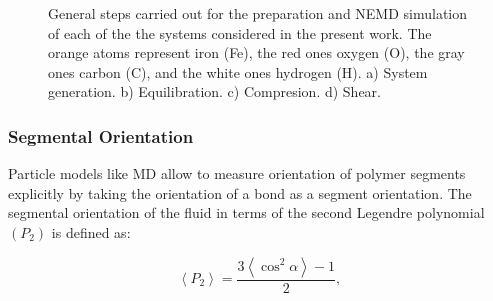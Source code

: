 \documentclass[aps,prb,reprint,superscriptaddress, a4paper]{revtex4-1}
\begin{document}
\begin{figure}
\begin{center}

		\caption{General steps carried out for the preparation and NEMD simulation of   each of the the systems considered in the present work. The orange atoms represent iron (Fe), the red ones oxygen (O), the gray ones carbon (C), and the white ones hydrogen (H). a) System generation. b) Equilibration. c) Compresion. d) Shear. }
		\label{fig:Steps}
	\end{center}
\end{figure}


\subsubsection{Segmental Orientation}

Particle models like MD allow to measure orientation of polymer segments explicitly by taking the orientation of a bond as a segment orientation. The segmental orientation \cite{Monnerie1983,Erman1985,Besbes1992} of the fluid in terms of the second Legendre polynomial $\left(P_2\right)$ is defined as:

\begin{equation}\label{eq:P_2}
\left\langle P_2 \right\rangle =\frac{3\left\langle \cos ^2 \alpha \right\rangle - 1}{2},
\end{equation}
\end{document}
